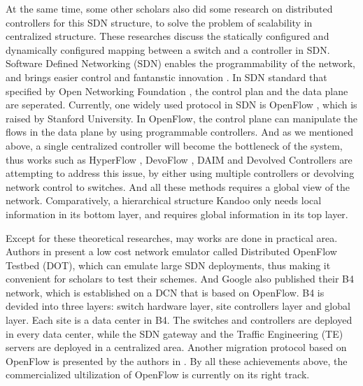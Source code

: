 At the same time, some other scholars also did some research \cite{localcen,elasticsdn,hyperflow,inpacket,onix} on distributed controllers for this SDN structure, to solve the problem of scalability in centralized structure. These researches discuss the statically configured and dynamically configured mapping between a switch and a controller in SDN. Software Defined Networking (SDN) enables the programmability of the network, and brings easier control and fantanstic innovation \cite{openflow,ethane,soft}. In SDN standard that specified by Open Networking Foundation \cite{onf}, the control plan and the data plane are seperated. Currently, one widely used protocol in SDN is OpenFlow \cite{openflow}, which is raised by Stanford University. In OpenFlow, the control plane can manipulate the flows in the data plane by using programmable controllers. And as we mentioned above, a single centralized controller will become the bottleneck of the system, thus works such as HyperFlow \cite{hyperflow}, DevoFlow \cite{DevoFlow}, DAIM \cite{DAIM} and Devolved Controllers \cite{devolved} are attempting to address this issue, by either using multiple controllers or devolving network control to switches. And all these methods requires a global view of the network. Comparatively, a hierarchical structure Kandoo \cite{kandoo} only needs local information in its bottom layer, and requires global information in its top layer.

Except for these theoretical researches, may works are done in practical area. Authors in \cite{DOT} present a low cost network emulator called Distributed OpenFlow Testbed (DOT), which can emulate large SDN deployments, thus making it convenient for scholars to test their schemes. And Google also published their B4 \cite{B4} network, which is established on a DCN that is based on OpenFlow. B4 is devided into three layers: switch hardware layer, site controllers layer and global layer. Each site is a data center in B4. The switches and controllers are deployed in every data center, while the SDN gateway and the Traffic Engineering (TE) servers are deployed in a centralized area. Another migration protocol based on OpenFlow is presented by the authors in \cite{elasticsdn}. By all these achievements above, the commercialized ultilization of OpenFlow is currently on its right track.
